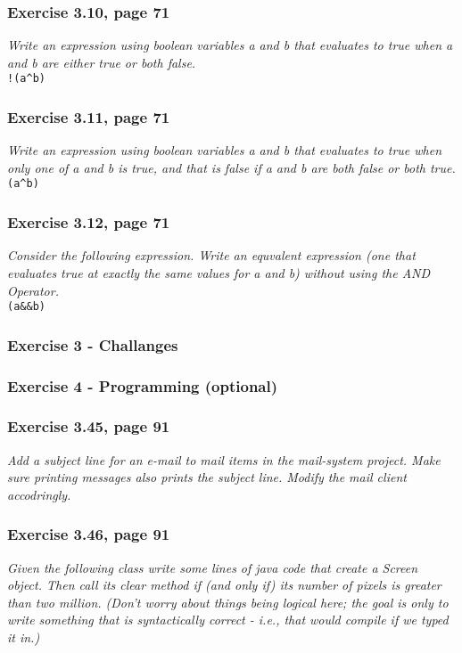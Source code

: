 \subsubsection*{Exercise 3.10, page 71}
\textit{Write an expression using boolean variables a and b that evaluates
to true when a and b are either true or both false.}\\

\lstinline?!(a^b)?

\subsubsection*{Exercise 3.11, page 71}
\textit{Write an expression using boolean variables a and b that evaluates
to true when only one of a and b is true, and that is false if a and b are
both false or both true.}\\

\lstinline?(a^b)?

\subsubsection*{Exercise 3.12, page 71}
\textit{Consider the following expression. Write an equvalent expression
(one that evaluates true at exactly the same values for a and b) without
using the AND Operator.}\\
\lstinline?(a&&b)?\\

\subsubsection{Exercise 3 - Challanges}

\subsubsection{Exercise 4 - Programming (optional)}
\subsubsection*{Exercise 3.45, page 91}
\textit{Add a subject line for an e-mail to mail items in the mail-system
project. Make sure printing messages also prints the subject line. Modify
the mail client accodringly.}\\

\subsubsection*{Exercise 3.46, page 91}
\textit{Given the following class write some lines of java code that create
a Screen object. Then call its clear method if (and only if) its number of
pixels is greater than two million. (Don't worry about things being logical
here; the goal is only to write something that is syntactically correct - 
i.e., that would compile if we typed it in.)}\\


